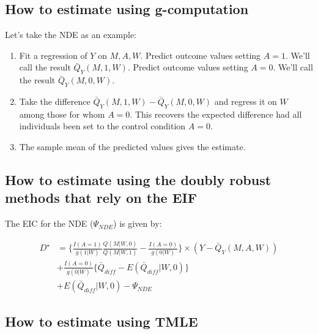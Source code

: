 \documentclass[
  12pt, krantz2,
]{book}
\providecommand{\tightlist}{%
  \setlength{\itemsep}{0pt}\setlength{\parskip}{0pt}}
\theoremstyle{definition}
\theoremstyle{definition}
\theoremstyle{definition}
\newcommand{\1}{\mathbbm{1}}
\begin{document}
\hypertarget{how-to-estimate-using-g-computation}{%
\subsection{How to estimate using g-computation}\label{how-to-estimate-using-g-computation}}

Let's take the NDE as an example:

\begin{enumerate}
\def\labelenumi{\arabic{enumi}.}
\tightlist
\item
  Fit a regression of \(Y\) on \(M,A,W\). Predict outcome values setting \(A=1\).
  We'll call the result \(\bar{Q}_Y(M,1,W)\). Predict outcome values setting
  \(A=0\). We'll call the result \(\bar{Q}_Y(M,0,W)\).
\item
  Take the difference \(\bar{Q}_Y(M,1,W) - \bar{Q}_Y(M,0,W)\) and regress it on
  \(W\) among those for whom \(A=0\). This recovers the expected difference had all
  individuals been set to the control condition \(A = 0\).
\item
  The sample mean of the predicted values gives the estimate.
\end{enumerate}

\hypertarget{how-to-estimate-using-the-doubly-robust-methods-that-rely-on-the-eif}{%
\subsection{How to estimate using the doubly robust methods that rely on the EIF}\label{how-to-estimate-using-the-doubly-robust-methods-that-rely-on-the-eif}}

The EIC for the NDE (\(\Psi_{NDE}\)) is given by:

\begin{align}
    D^{\star} &= \bigg\{ \frac{I(A=1)}{g(1|W)}\frac{Q(M|W,0)}{Q(M|W,1)} -
      \frac{I(A=0)}{g(0|W)}\bigg\} \times (Y-\bar{Q}_Y(M,A,W))  \\
    &+ \frac{I(A=0)}{g(0|W)}\{ \bar{Q}_{diff} - E(\bar{Q}_{diff} | W,0) \}\\
    &+ E(\bar{Q}_{diff} | W,0) - \Psi_{NDE}
\end{align}

\hypertarget{how-to-estimate-using-tmle}{%
\subsection{How to estimate using TMLE}\label{how-to-estimate-using-tmle}}
\end{document}
